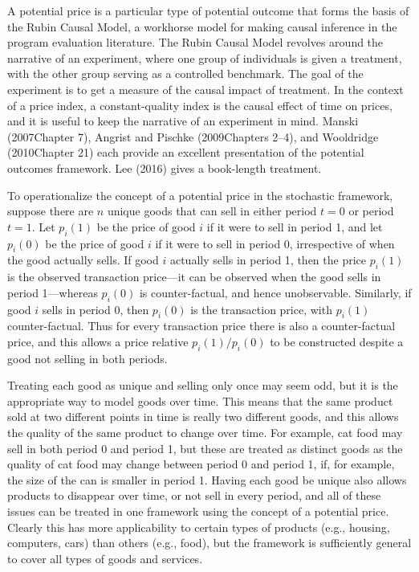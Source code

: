 \documentclass[
]{article}
\begin{document}
A potential price is a particular type of potential outcome that forms the basis of the Rubin Causal Model, a workhorse model for making causal inference in the program evaluation literature. The Rubin Causal Model revolves around the narrative of an experiment, where one group of individuals is given a treatment, with the other group serving as a controlled benchmark. The goal of the experiment is to get a measure of the causal impact of treatment. In the context of a price index, a constant-quality index is the causal effect of time on prices, and it is useful to keep the narrative of an experiment in mind. Manski (2007Chapter 7), Angrist and Pischke (2009Chapters 2--4), and Wooldridge (2010Chapter 21) each provide an excellent presentation of the potential outcomes framework. Lee (2016) gives a book-length treatment.

To operationalize the concept of a potential price in the stochastic framework, suppose there are \(n\) unique goods that can sell in either period \(t = 0\) or period \(t = 1\). Let \(p_{i}(1)\) be the price of good \(i\) if it were to sell in period 1, and let \(p_{i}(0)\) be the price of good \(i\) if it were to sell in period 0, irrespective of when the good actually sells. If good \(i\) actually sells in period 1, then the price \(p_{i}(1)\) is the observed transaction price---it can be observed when the good sells in period 1---whereas \(p_{i}(0)\) is counter-factual, and hence unobservable. Similarly, if good \(i\) sells in period 0, then \(p_{i}(0)\) is the transaction price, with \(p_{i}(1)\) counter-factual. Thus for every transaction price there is also a counter-factual price, and this allows a price relative \(p_{i}(1) / p_{i}(0)\) to be constructed despite a good not selling in both periods.

Treating each good as unique and selling only once may seem odd, but it is the appropriate way to model goods over time. This means that the same product sold at two different points in time is really two different goods, and this allows the quality of the same product to change over time. For example, cat food may sell in both period 0 and period 1, but these are treated as distinct goods as the quality of cat food may change between period 0 and period 1, if, for example, the size of the can is smaller in period 1. Having each good be unique also allows products to disappear over time, or not sell in every period, and all of these issues can be treated in one framework using the concept of a potential price. Clearly this has more applicability to certain types of products (e.g., housing, computers, cars) than others (e.g., food), but the framework is sufficiently general to cover all types of goods and services.
\end{document}
